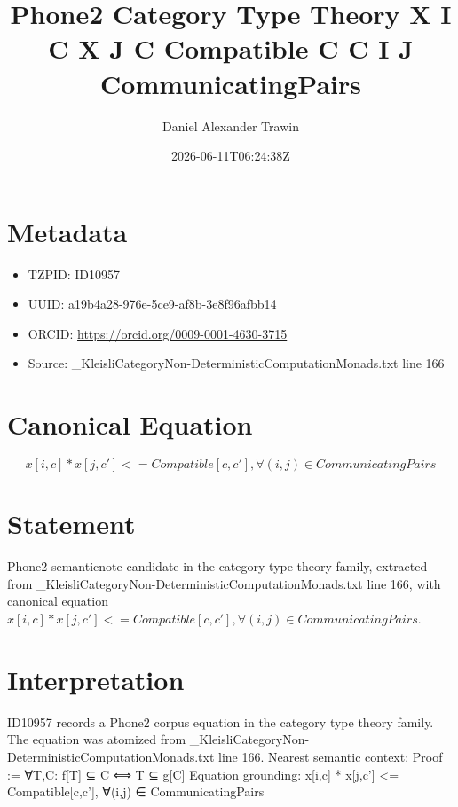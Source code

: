 \documentclass[11pt]{article}
\title{Phone2 Category Type Theory X I C X J C Compatible C C I J CommunicatingPairs}
\author{Daniel Alexander Trawin}
\date{2026-06-11T06:24:38Z}
\begin{document}
\maketitle
\section*{Metadata}
\begin{itemize}
\item TZPID: ID10957
\item UUID: a19b4a28-976e-5ce9-af8b-3e8f96afbb14
\item ORCID: \url{https://orcid.org/0009-0001-4630-3715}
\item Source: _KleisliCategoryNon-DeterministicComputationMonads.txt line 166
\end{itemize}
\section*{Canonical Equation}
\[
x[i,c] * x[j,c'] <= Compatible[c,c'], ∀(i,j) ∈ CommunicatingPairs
\]
\section*{Statement}
Phone2 semanticnote candidate in the category type theory family, extracted from _KleisliCategoryNon-DeterministicComputationMonads.txt line 166, with canonical equation $x[i,c] * x[j,c'] <= Compatible[c,c'], ∀(i,j) ∈ CommunicatingPairs$.
\section*{Interpretation}
ID10957 records a Phone2 corpus equation in the category type theory family. The equation was atomized from _KleisliCategoryNon-DeterministicComputationMonads.txt line 166. Nearest semantic context: Proof := ∀T,C: f[T] ⊆ C ⟺ T ⊆ g[C] Equation grounding: x[i,c] * x[j,c'] <= Compatible[c,c'], ∀(i,j) ∈ CommunicatingPairs
\end{document}
